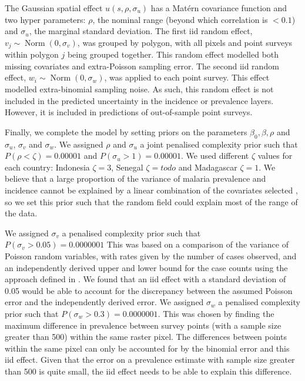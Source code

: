 \documentclass[10pt,letterpaper]{article}
\begin{document}
The Gaussian spatial effect $u(s, \rho, \sigma_u)$ has a Mat\'ern covariance function and two hyper parameters: $\rho$, the nominal range (beyond which correlation is $< 0.1$) and $\sigma_u$, the marginal standard deviation.
The first iid random effect, $v_j \sim \operatorname{Norm}(0, \sigma_v)$,  was grouped by polygon, with all pixels and point surveys within polygon $j$ being grouped together.
This random effect modelled both missing covariates and extra-Poisson sampling error. 
The second iid random effect, $w_i \sim \operatorname{Norm}(0, \sigma_w)$, was applied to each point survey.
This effect modelled extra-binomial sampling noise.
As such, this random effect is not included in the predicted uncertainty in the incidence or prevalence layers.
However, it is included in predictions of out-of-sample point surveys.

Finally, we complete the model by setting priors on the parameters $\beta_0, \beta, \rho$ and $\sigma_u$, $\sigma_v$ and $\sigma_w$.
We assigned $\rho$ and $\sigma_u$ a joint penalised complexity prior \cite{fuglstad2018constructing} such that $P(\rho < \zeta) = 0.00001$ and $P(\sigma_u > 1) = 0.00001$.
We used different $\zeta$ values for each country: Indonesia $\zeta = 3$, Senegal $\zeta = todo$ and Madagascar $\zeta = 1$.
We believe that a large proportion of the variance of malaria prevalence and incidence cannot be explained by a linear combination of the covariates selected \cite{bhatt2017improved}, so we set this prior such that the random field could explain most of the range of the data.

We assigned $\sigma_v$ a penalised complexity prior \cite{simpson2017penalising} such that $P(\sigma_v > 0.05) = 0.0000001$
This was based on a comparison of the variance of Poisson random variables, with rates given by the number of cases observed, and an independently derived upper and lower bound for the case counts using the approach defined in \cite{cibulskis2011worldwide}.
We found that an iid effect with a standard deviation of 0.05 would be able to account for the discrepancy between the assumed Poisson error and the independently derived error.
We assigned $\sigma_w$ a penalised complexity prior such that $P(\sigma_w > 0.3) = 0.0000001$. 
This was chosen by finding the maximum difference in prevalence between survey points (with a sample size greater than 500) within the same raster pixel.
The differences between points within the same pixel can only be accounted for by the binomial error and this iid effect.
Given that the error on a prevalence estimate with sample size greater than 500 is quite small, the iid effect needs to be able to explain this difference.
\end{document}
